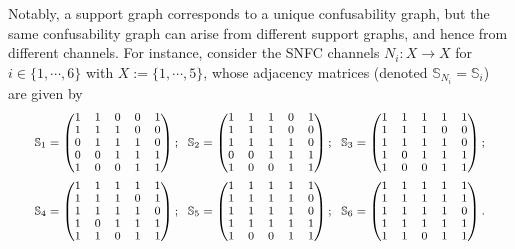 \documentclass[12pt,a4paper]{article}
\begin{document}
\noindent Notably, a support graph corresponds to a unique confusability graph, but the same confusability graph can arise from different support graphs, and hence from different channels. For instance, consider the SNFC channels $N_i : X \to X$ for $i \in \{1, \cdots, 6\}$ with $X := \{1,\cdots, 5\}$, whose adjacency matrices (denoted $\mathbb{S}_{N_i}=\mathbb{S}_i$) are given by
\begin{align}
{\fontsize{8}{9}\selectfont
\begin{aligned}
\mathbb{S}_1 = 
\begin{pmatrix}
        1 & 1 & 0 & 0 & 1 \\
        1 & 1 & 1 & 0 & 0 \\
        0 & 1 & 1 & 1 & 0 \\
        0 & 0 & 1 & 1 & 1 \\
        1 & 0 & 0 & 1 & 1
\end{pmatrix};~~
\mathbb{S}_2 = 
\begin{pmatrix}
        1 & 1 & 1 & 0 & 1 \\
        1 & 1 & 1 & 0 & 0 \\
        1 & 1 & 1 & 1 & 0 \\
        0 & 0 & 1 & 1 & 1 \\
        1 & 0 & 0 & 1 & 1
\end{pmatrix};~~
\mathbb{S}_3= 
\begin{pmatrix}
        1 & 1 & 1 & 1 & 1 \\
        1 & 1 & 1 & 0 & 0 \\
        1 & 1 & 1 & 1 & 0 \\
        1 & 0 & 1 & 1 & 1 \\
        1 & 0 & 0 & 1 & 1
\end{pmatrix};\\
\mathbb{S}_4 = 
\begin{pmatrix}
        1 & 1 & 1 & 1 & 1 \\
        1 & 1 & 1 & 0 & 1 \\
        1 & 1 & 1 & 1 & 0 \\
        1 & 0 & 1 & 1 & 1 \\
        1 & 1 & 0 & 1 & 1
\end{pmatrix};~~
\mathbb{S}_5 = 
\begin{pmatrix}
        1 & 1 & 1 & 1 & 1 \\
        1 & 1 & 1 & 1 & 0 \\
        1 & 1 & 1 & 1 & 0 \\
        1 & 1 & 1 & 1 & 1 \\
        1 & 0 & 0 & 1 & 1
\end{pmatrix};~~
\mathbb{S}_6= 
\begin{pmatrix}
        1 & 1 & 1 & 1 & 1 \\
        1 & 1 & 1 & 1 & 1 \\
        1 & 1 & 1 & 1 & 0 \\
        1 & 1 & 1 & 1 & 1 \\
        1 & 1 & 0 & 1 & 1
\end{pmatrix}.
\end{aligned}}\label{penta}
\end{align}
\end{document}
